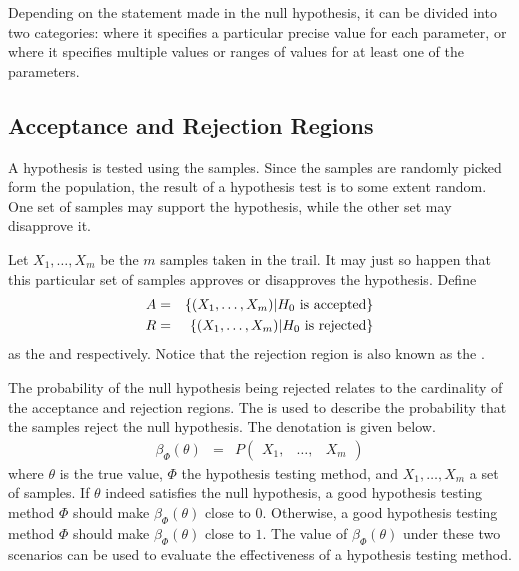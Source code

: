 Depending on the statement made in the null hypothesis, it can be divided into two categories:  where it specifies a particular precise value for each parameter, or  where it specifies multiple values or ranges of values for at least one of the parameters. 

\subsection{Acceptance and Rejection Regions}

A hypothesis is tested using the samples. Since the samples are randomly picked form the population, the result of a hypothesis test is to some extent random. One set of samples may support the hypothesis, while the other set may disapprove it.

Let $X_1, \ldots, X_m$ be the $m$ samples taken in the trail. It may just so happen that this particular set of samples approves or disapproves the hypothesis. Define
\begin{eqnarray}
	A &=& \left\{\left(X_1, \ldots, X_m\right)\middle| H_0 \textup{~is accepted}\right\} \label{eq:htest_a} \\
	R &=& \left\{\left(X_1, \ldots, X_m\right)\middle| H_0 \textup{~is rejected}\right\} \label{eq:htest_r}
\end{eqnarray}
as the  and  respectively. Notice that the rejection region is also known as the . 

The probability of the null hypothesis being rejected relates to the cardinality of the acceptance and rejection regions. The  is used to describe the probability that the samples reject the null hypothesis. The denotation is given below.
\begin{eqnarray}
	\beta_\Phi(\theta) &=& P\left(\begin{array}{ccc}
		X_1, & \ldots, & X_m
	\end{array}\right) \nonumber
\end{eqnarray}
where $\theta$ is the true value, $\Phi$ the hypothesis testing method, and $X_1, \ldots, X_m$ a set of samples. If $\theta$ indeed satisfies the null hypothesis, a good hypothesis testing method $\Phi$ should make $\beta_\Phi(\theta)$ close to $0$. Otherwise, a good hypothesis testing method $\Phi$ should make $\beta_\Phi(\theta)$ close to $1$. The value of $\beta_\Phi(\theta)$ under these two scenarios can be used to evaluate the effectiveness of a hypothesis testing method.

